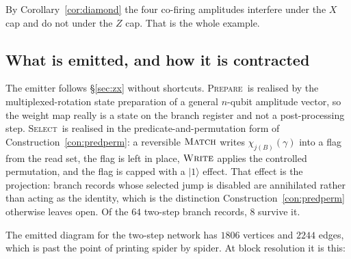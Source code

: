 \documentclass[11pt]{article}
\theoremstyle{definition}
\theoremstyle{plain}
\newcommand{\PREP}{\textsc{Prepare}}
\newcommand{\SEL}{\textsc{Select}}
\newcommand{\MATCH}{\textsc{Match}}
\newcommand{\WRITE}{\textsc{Write}}
\newcommand{\ket}[1]{| #1 \rangle}
\begin{document}
By Corollary~\ref{cor:diamond} the four co-firing amplitudes interfere under the
$X$ cap and do not under the $Z$ cap. That is the whole example.

\subsection{What is emitted, and how it is contracted}\label{ssec:machinery}

The emitter follows \S\ref{sec:zx} without shortcuts. \PREP\ is realised by the
multiplexed-rotation state preparation of a general $n$-qubit amplitude vector,
so the weight map really is a state on the branch register and not a
post-processing step. \SEL\ is realised in the predicate-and-permutation form of
Construction~\ref{con:predperm}: a reversible $\MATCH$ writes
$\chi_{j(B)}(\gamma)$ into a flag from the read set, the flag is left in place,
$\WRITE$ applies the controlled permutation, and the flag is capped with a
$\ket{1}$ effect. That effect is the projection: branch records whose selected
jump is disabled are annihilated rather than acting as the identity, which is
the distinction Construction~\ref{con:predperm} otherwise leaves open. Of the
$64$ two-step branch records, $8$ survive it.

The emitted diagram for the two-step network has $1806$ vertices and $2244$
edges, which is past the point of printing spider by spider. At block
resolution it is this:
\end{document}
